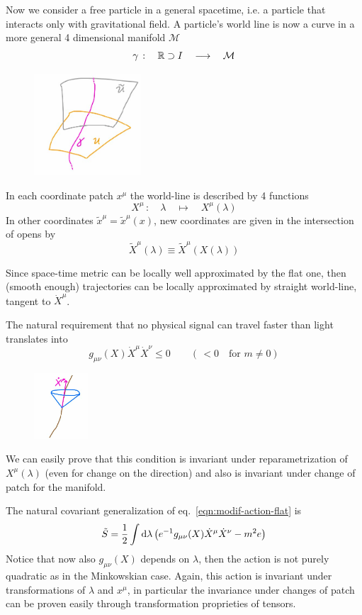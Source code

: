 \documentclass[../main/main.tex]{subfiles}
\begin{document}
Now we consider a free particle in a general spacetime, i.e. a particle that  interacts only with gravitational field. 
A particle's world line is now a curve in a more general 4 dimensional manifold $\mathcal M$
\[\gamma\,:\quad\mathbb{R}\supset I\quad\longrightarrow\quad \mathcal M\]
\begin{figure}[H]
\centering
\includegraphics[width=4cm]{../img/trajectory-manifold.jpg}
\end{figure}
\noindent
In each coordinate patch $x^\mu$ the world-line is described by 4 functions
\[X^\mu\,:\quad\lambda\quad\longmapsto\quad X^\mu(\lambda)\]
In other coordinates $\tilde x^\mu=\tilde x^\mu(x)$, new coordinates are given in the intersection of opens by
\[\tilde X^\mu(\lambda)\equiv\tilde X^\mu(X(\lambda))\]

Since space-time metric can be locally well approximated by the flat one, then (smooth enough) trajectories can be locally approximated by straight world-line, tangent to $\dot X^\mu$. 

The natural requirement that no physical signal can travel faster than light translates into
\begin{equation}\label{eqn:no-faster-light-cond-metric}
g_{\mu\nu}(X)\dot X^\mu\dot X^\nu\leq0\qquad(\,<0\quad\text{for }m\neq0)
\end{equation}
\begin{figure}[H]
\centering
\includegraphics[width=2cm]{../img/less-than-speed-light-traj.jpg}
\end{figure}
\noindent
We can easily prove that this condition is invariant under reparametrization of $X^\mu(\lambda)$ (even for change on the direction) and also is invariant under change of patch for the manifold. 

The natural covariant generalization of eq.~\eqref{eqn:modif-action-flat} is 
\begin{equation}\label{eqn:action-curved-spacetime}
\tilde S=\frac12\int\textup{d}\lambda\left(e^{-1}g_{\mu\nu}(X)\dot X^\mu\dot X^\nu-m^2e\right)
\end{equation}
Notice that now also $g_{\mu\nu}(X)$ depends on $\lambda$, then  the action is not purely quadratic as in the Minkowskian case. Again, this action is invariant under transformations of $\lambda$ and $x^\mu$, in particular the invariance under changes of patch can be proven easily through transformation proprieties of tensors. 
\end{document}
